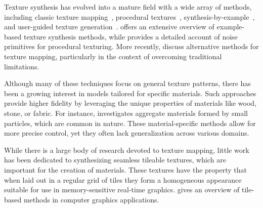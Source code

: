 Texture synthesis has evolved into a mature field with a wide array of methods, including classic texture mapping~\citep{blinn76}, procedural textures~\citep{perlin-1985}, synthesis-by-example~\citep{efros99}, and user-guided texture generation~\citep{haeberli90}. \citet{pauly-2009} offers an extensive overview of example-based texture synthesis methods, while \citet{etal-2010} provides a detailed account of noise primitives for procedural texturing. More recently, \citet{rethinkngtex} discuss alternative methods for texture mapping, particularly in the context of overcoming traditional limitations.
%

Although many of these techniques focus on general texture patterns, there has been a growing interest in models tailored for specific materials. Such approaches provide higher fidelity by leveraging the unique properties of materials like wood, stone, or fabric. For instance, \citet{dorsey-2004} investigates aggregate materials formed by small particles, which are common in nature. These material-specific methods allow for more precise control, yet they often lack generalization across various domains.


While there is a large body of research devoted to texture mapping, little work has been dedicated to synthesizing seamless tileable textures, which are important for the creation of materials. These textures have the property that when laid out in a regular grid of tiles they form a homogeneous appearance suitable for use in memory-sensitive real-time graphics. \citet{tileinteractive} gives an overview of tile-based methods in computer graphics applications.



